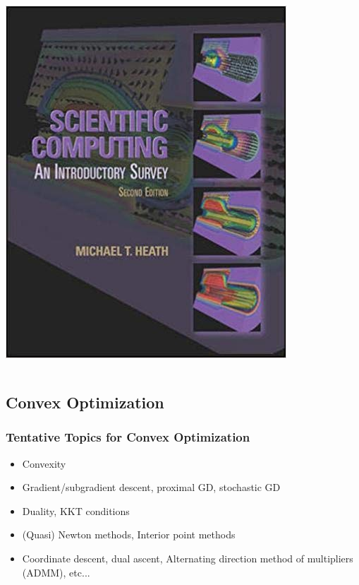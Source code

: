 \documentclass[10pt]{beamer}
\begin{document}
\begin{frame}
\begin{columns}
\begin{itemize}
            \includegraphics[height=0.5\textheight]{scientific-computing.jpg}
    \end{itemize}
  \end{columns}
\end{frame}

\subsection{Convex Optimization}
\begin{frame}[t]
  \frametitle{Tentative Topics for Convex Optimization}
  \begin{itemize}
   \item <2-> Convexity
   \item <3-> Gradient/subgradient descent, proximal GD, stochastic GD
   \item <4-> Duality, KKT conditions
   \item <5-> (Quasi) Newton methods, Interior point methods
   \item <6-> Coordinate descent, dual ascent, Alternating direction method of multipliers (ADMM), etc...
  \end{itemize}
\end{frame}
\end{document}
